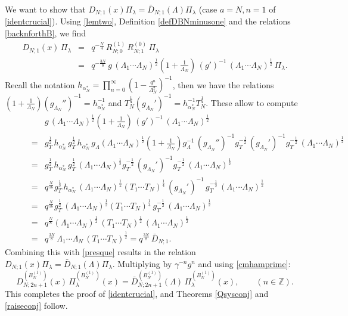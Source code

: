 \documentclass[12pt]{amsart}
\newcommand{\barD}{\bar D}
\newcommand{\Z}{{\mathbb Z}}
\newcommand{\al}{{\alpha}}
\newcommand{\lL}{{\Lambda}}
\newcommand{\half}{\frac{1}{2}}
\numberwithin{equation}{section}
\begin{document}
We want to show that $D_{N;1}(x)\Pi_\lambda= \barD_{N;1}(\Lambda)\Pi_\lambda$ (case $a=N,n=1$ of \eqref{identcrucial}). Using \ref{lemtwo}, Definition \eqref{defDBNminusone} and the relations \eqref{backnforthB}, we find
\begin{eqnarray}
D_{N;1}(x)\, \Pi_\lambda&=& q^{-\frac{N}{4}}\,R_{N;0}^{(1)} \,R_{N;1}^{(0)} \, \Pi_\lambda
\nonumber\\
%
%
%
%
%
%
%
&=&q^{-\frac{3N}{8}}\,g\, (\lL_1\cdots \lL_N)^\half \left(1+\frac{1}{\lL_N}\right)\, (g')^{-1} \,(\lL_1\cdots \lL_N)^\half \, \Pi_\lambda\label{presque}.
\end{eqnarray}
%
%
%
%
Recall the notation
$h_{\al_N^*}=\prod_{n=0}^{\infty} \left( 1-\frac{q^n}{\lL_N^2}\right)^{-1}$, then we have the relations
$\left(1+\frac{1}{\lL_N}\right)(g_{\lL_N}'')^{-1}=h_{\al_N^*}^{-1}$
and $T_N^{\frac{1}{4}} (g_{\lL_N}')^{-1}=h_{\al_N^*}^{-1}T_N^{\frac{1}{4}}$. These allow to compute
\begin{eqnarray}&&\!\!\!\!\!\!\!\!\!\!\!\!\!\!\!\!\!\!\!\!g\, (\lL_1\cdots \lL_N)^\half \left(1+\frac{1}{\lL_N}\right) \,(g')^{-1}\,(\lL_1\cdots \lL_N)^\half\nonumber \\
&=& g_T^\half \, h_{\al_N^*}\,g_T^\half\, h_{\al_N^*}\,g_\lL(\lL_1\cdots \lL_N)^\half \!\!\left(1+\frac{1}{\lL_N}\right)
g_\lL^{-1}\,(g_{\lL_N}'')^{-1} g_T^{-\half}\,(g_{\lL_N}')^{-1}g_T^{-\half}\,(\lL_1\cdots \lL_N)^\half\nonumber \\
&=& g_T^\half \, h_{\al_N^*}\,g_T^\half\, (\lL_1\cdots \lL_N)^\half 
g_T^{-\half}\,(g_{\lL_N}')^{-1}g_T^{-\half}\,(\lL_1\cdots \lL_N)^\half\nonumber \\
&=& q^{\frac{N}{16}} g_T^\half \, h_{\al_N^*}\, (\lL_1\cdots \lL_N)^\half(T_1\cdots T_N)^{\frac{1}{4}}\,(g_{\lL_N}')^{-1}\,g_T^{-\half}\,(\lL_1\cdots \lL_N)^\half\nonumber \\
&=& q^{\frac{N}{16}} g_T^\half \,  (\lL_1\cdots \lL_N)^\half(T_1\cdots T_N)^{\frac{1}{4}}\,g_T^{-\half}\,(\lL_1\cdots \lL_N)^\half\nonumber \\
&=&q^{\frac{N}{8}} (\lL_1\cdots \lL_N)^\half\, (T_1\cdots T_N)^{\half}\,(\lL_1\cdots \lL_N)^\half\nonumber \\
\qquad &=&q^{\frac{3N}{8}}\,\lL_1\cdots \lL_N\, (T_1\cdots T_N)^\half=q^{\frac{3N}{8}}\, \barD_{N;1}. \label{cestca}
\end{eqnarray}
%
%
Combining this with \eqref{presque} results in the relation
%
$D_{N;1}(x)\Pi_\lambda= \barD_{N;1}(\Lambda)\Pi_\lambda$. Multiplying by $\gamma^{-n}g^n$ and using \eqref{cmhamprime}:
\begin{equation}\label{cestlafin}
D_{N;2n+1}^{(B_N^{(1)})}(x)\, \Pi_\lambda^{(B_N^{(1)})}(x)=\barD_{N;2n+1}^{(B_N^{(1)})}(\lL)\, \Pi_\lambda^{(B_N^{(1)})}(x),\qquad (n\in \Z).
\end{equation}
This completes the proof of \eqref{identcrucial}, and Theorems \ref{Qsysconj} and \ref{raiseconj} follow.
\end{document}
